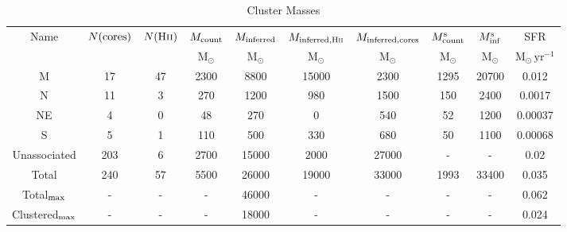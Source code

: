 \begin{table*}[htp]
\centering
\begin{minipage}{160mm}
\caption{Cluster Masses}
\begin{tabular}{cccccccccc}
\label{tab:clustermassestimates}
Name & $N({\rm cores})$ & $N({\rm H\textsc{ii}})$ & $M_{\rm count}$ & $M_{\rm inferred}$ & $M_{\rm inferred, H\textsc{ii}}$ & $M_{\rm inferred, cores}$ & $M_{\rm count}^{\rm s}$ & $M_{\rm inf}^{\rm s}$ & SFR \\
 &  &  & $\mathrm{M_{\odot}}$ & $\mathrm{M_{\odot}}$ & $\mathrm{M_{\odot}}$ & $\mathrm{M_{\odot}}$ & $\mathrm{M_{\odot}}$ & $\mathrm{M_{\odot}}$ & $\mathrm{M_{\odot}\,yr^{-1}}$ \\
\hline
M & 17 & 47 & 2300 & 8800 & 15000 & 2300 & 1295 & 20700 & 0.012 \\
N & 11 & 3 & 270 & 1200 & 980 & 1500 & 150 & 2400 & 0.0017 \\
NE & 4 & 0 & 48 & 270 & 0 & 540 & 52 & 1200 & 0.00037 \\
S & 5 & 1 & 110 & 500 & 330 & 680 & 50 & 1100 & 0.00068 \\
Unassociated & 203 & 6 & 2700 & 15000 & 2000 & 27000 & - & - & 0.02 \\
Total & 240 & 57 & 5500 & 26000 & 19000 & 33000 & 1993 & 33400 & 0.035 \\
Total$_{\rm max}$ & - & - & - & 46000 & - & - & - & - & 0.062 \\
Clustered$_{\rm max}$ & - & - & - & 18000 & - & - & - & - & 0.024 \\
\hline
\end{tabular}\\

\end{minipage}
\end{table*}
